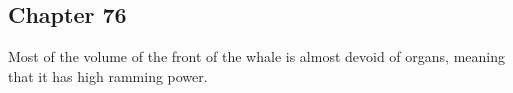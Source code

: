 \subsection{Chapter 76}

Most of the volume of the front of the whale is almost devoid of organs,
meaning that it has high ramming power.
